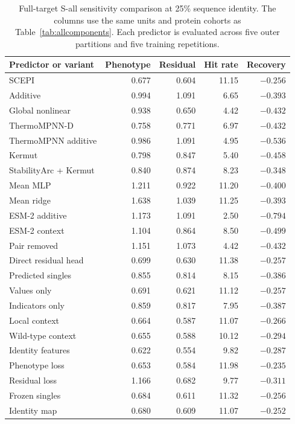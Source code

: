 \documentclass{llncs}
\begin{document}
\begin{table}[!htbp]
\centering
\setlength{\tabcolsep}{5pt}
\caption{Full-target S-all sensitivity comparison at 25\% sequence identity. The columns use the same units and protein cohorts as Table~\ref{tab:allcomponents}. Each predictor is evaluated across five outer partitions and five training repetitions.}
\label{tab:threshold25}
\begin{tabular}{lrrrr}
\toprule
Predictor or variant & Phenotype & Residual & Hit rate & Recovery \\
\midrule
SCEPI & 0.677 & 0.604 & 11.15 & $-0.256$ \\
Additive & 0.994 & 1.091 & 6.65 & $-0.393$ \\
Global nonlinear & 0.938 & 0.650 & 4.42 & $-0.432$ \\
ThermoMPNN-D & 0.758 & 0.771 & 6.97 & $-0.432$ \\
ThermoMPNN additive & 0.986 & 1.091 & 4.95 & $-0.536$ \\
Kermut & 0.798 & 0.847 & 5.40 & $-0.458$ \\
StabilityArc + Kermut & 0.840 & 0.874 & 8.23 & $-0.348$ \\
Mean MLP & 1.211 & 0.922 & 11.20 & $-0.400$ \\
Mean ridge & 1.638 & 1.039 & 11.25 & $-0.393$ \\
ESM-2 additive & 1.173 & 1.091 & 2.50 & $-0.794$ \\
ESM-2 context & 1.104 & 0.864 & 8.50 & $-0.499$ \\
Pair removed & 1.151 & 1.073 & 4.42 & $-0.432$ \\
Direct residual head & 0.699 & 0.630 & 11.38 & $-0.257$ \\
Predicted singles & 0.855 & 0.814 & 8.15 & $-0.386$ \\
Values only & 0.691 & 0.621 & 11.12 & $-0.257$ \\
Indicators only & 0.859 & 0.817 & 7.95 & $-0.387$ \\
Local context & 0.664 & 0.587 & 11.07 & $-0.266$ \\
Wild-type context & 0.655 & 0.588 & 10.12 & $-0.294$ \\
Identity features & 0.622 & 0.554 & 9.82 & $-0.287$ \\
Phenotype loss & 0.653 & 0.584 & 11.98 & $-0.235$ \\
Residual loss & 1.166 & 0.682 & 9.77 & $-0.311$ \\
Frozen singles & 0.684 & 0.611 & 11.32 & $-0.256$ \\
Identity map & 0.680 & 0.609 & 11.07 & $-0.252$ \\

\end{tabular}
\end{table}
\end{document}

